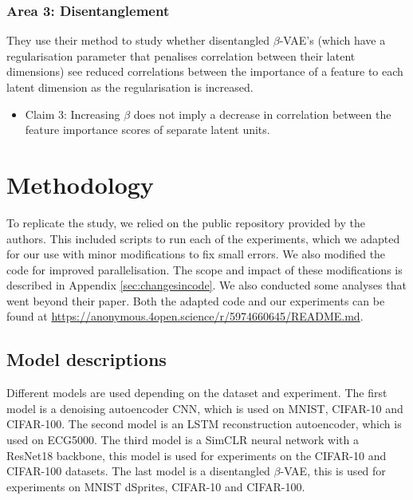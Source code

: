 \subsubsection{Area 3: Disentanglement} They use their method to study whether disentangled $\beta$-VAE’s (which have a regularisation parameter that penalises correlation between their latent dimensions) see reduced correlations between the importance of a feature to each latent dimension as the regularisation is increased.
\begin{itemize}
\label{claim3}
\item Claim 3: Increasing  $\beta$ does not imply a decrease in correlation between the feature importance scores of separate latent units. 
\end{itemize}
	


\section{Methodology}
\label{sec:methodology}


To replicate the study, we relied on the public repository provided by the authors. This included scripts to run each of the experiments, which we adapted for our use with minor modifications to fix small errors. We also modified the code for improved parallelisation. The scope and impact of these modifications is described in Appendix \ref{sec:changesincode}. We also conducted some analyses that went beyond their paper. Both the adapted code and our experiments can be found at \url{https://anonymous.4open.science/r/5974660645/README.md}.

\subsection{Model descriptions}

Different models are used depending on the dataset and experiment. The first model is a denoising autoencoder CNN, which is used on MNIST, CIFAR-10 and CIFAR-100. The second model is an LSTM reconstruction autoencoder, which is used on ECG5000. The third model is a SimCLR neural network with a ResNet18 backbone, this model is used for experiments on the CIFAR-10 and CIFAR-100 datasets. The last model is a disentangled $\beta$-VAE, this is used for experiments on MNIST dSprites, CIFAR-10 and CIFAR-100. 

